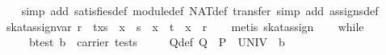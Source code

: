 \begin{isabellebody}
%
\isadelimproof
\ \ %
\endisadelimproof
%
\isatagproof
{}\isamarkupfalse%
\ {}simp\ add{}\ satisfies{}def\ module{}def\ NAT{}def{}\ transfer{}\ simp\ add{}\ assigns{}def{}%
\endisatagproof
{\isafoldproof}%
%
\isadelimproof
\isanewline
%
\endisadelimproof
\isanewline
{}\isamarkupfalse%
\ skat{}assign{}{}var{}\ {}r\ {}\ t{}x{}s{}\ {}\ {}x\ {}{}\ s\ {}\ x\ {}{}\ t{}\ {}\ {}x\ {}{}\ r{}{}\isanewline
%
\isadelimproof
\ \ %
\endisadelimproof
%
\isatagproof
{}\isamarkupfalse%
\ {}metis\ skat{}assign{}{}%
\endisatagproof
{\isafoldproof}%
%
\isadelimproof
\isanewline
%
\endisadelimproof
\isanewline
\isanewline
\isanewline
\ \ \isamarkupfalse%
\ while{}\isanewline
\ \ \ \ \ b{}test{}\ {}b\ {}\ carrier\ tests{}\isanewline
\ \ \ \ \ Q{}def{}\ {}Q\ {}\ P\ {}\ {}UNIV\ {}\ {}b{}{}\isanewline

\end{isabellebody}
